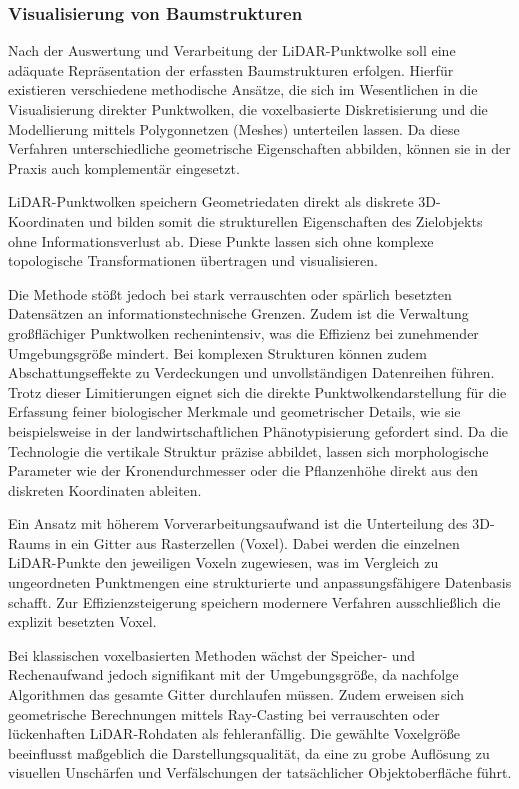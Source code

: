 \subsubsection{Visualisierung von Baumstrukturen}

Nach der Auswertung und Verarbeitung der LiDAR-Punktwolke soll eine adäquate Repräsentation der erfassten Baumstrukturen erfolgen. Hierfür existieren verschiedene methodische Ansätze, die sich im Wesentlichen in die Visualisierung direkter Punktwolken, die voxelbasierte Diskretisierung und die Modellierung mittels Polygonnetzen (Meshes) unterteilen lassen. Da diese Verfahren unterschiedliche geometrische Eigenschaften abbilden, können sie in der Praxis auch komplementär eingesetzt.

LiDAR-Punktwolken speichern Geometriedaten direkt als diskrete 3D-Koordinaten und bilden somit die strukturellen Eigenschaften des Zielobjekts ohne Informationsverlust ab. Diese Punkte lassen sich ohne komplexe topologische Transformationen übertragen und visualisieren. \citep{wangAutomatedPhenotypicTrait2024}

Die Methode stößt jedoch bei stark verrauschten oder spärlich besetzten Datensätzen an informationstechnische Grenzen. Zudem ist die Verwaltung großflächiger Punktwolken rechenintensiv, was die Effizienz bei zunehmender Umgebungsgröße mindert. \citep{chengRealTimeLiDARInertial2024} Bei komplexen Strukturen können zudem Abschattungseffekte zu Verdeckungen und unvollständigen Datenreihen führen. Trotz dieser Limitierungen eignet sich die direkte Punktwolkendarstellung für die Erfassung feiner biologischer Merkmale und geometrischer Details, wie sie beispielsweise in der landwirtschaftlichen Phänotypisierung gefordert sind. Da die Technologie die vertikale Struktur präzise abbildet, lassen sich morphologische Parameter wie der Kronendurchmesser oder die Pflanzenhöhe direkt aus den diskreten Koordinaten ableiten. \citep{wangAutomatedPhenotypicTrait2024}

Ein Ansatz mit höherem Vorverarbeitungsaufwand ist die Unterteilung des 3D-Raums in ein Gitter aus Rasterzellen (Voxel). Dabei werden die einzelnen LiDAR-Punkte den jeweiligen Voxeln zugewiesen, was im Vergleich zu ungeordneten Punktmengen eine strukturierte und anpassungsfähigere Datenbasis schafft. Zur Effizienzsteigerung speichern modernere Verfahren ausschließlich die explizit besetzten Voxel. \citep{chengRealTimeLiDARInertial2024}

Bei klassischen voxelbasierten Methoden wächst der Speicher- und Rechenaufwand jedoch signifikant mit der Umgebungsgröße, da nachfolge Algorithmen das gesamte Gitter durchlaufen müssen. Zudem erweisen sich geometrische Berechnungen mittels Ray-Casting bei verrauschten oder lückenhaften LiDAR-Rohdaten als fehleranfällig. Die gewählte Voxelgröße beeinflusst maßgeblich die Darstellungsqualität, da eine zu grobe Auflösung zu visuellen Unschärfen und Verfälschungen der tatsächlicher Objektoberfläche führt. \citep{chengRealTimeLiDARInertial2024}

